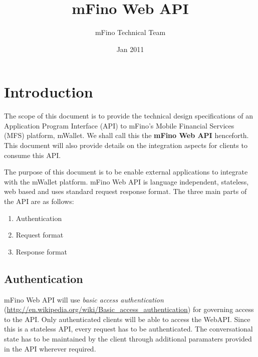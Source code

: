 \documentclass[11pt,titlepage]{article}
\title{\Huge{mFino Web API}}
\author{\Large{mFino Technical Team}}
\date {\Large{Jan 2011}}
\begin{document}
\maketitle
\tableofcontents
\listoftables

\newpage
\section{Introduction}
The scope of this document is to provide the technical design specifications of an Application Program Interface (API) to mFino's Mobile Financial Services (MFS) platform, mWallet. We shall call this the \textbf{mFino Web API} henceforth. This document will also provide details on the integration aspects for clients to consume this API.

The purpose of this document is to be enable external applications to integrate with the mWallet platform. mFino Web API is language independent, stateless, web based and uses standard request response format. The three main parts of the API are as follows:
\begin{enumerate}
\item Authentication
\item Request format
\item Response format
\end{enumerate}

\subsection{Authentication}
mFino Web API will use {\em basic access authentication}  ({\url{http://en.wikipedia.org/wiki/Basic_access_authentication}}) for governing  access to the API. Only authenticated clients will be able to access the WebAPI. Since this is a stateless API, every request has to be authenticated. The conversational state has to be maintained by the client through additional paramaters provided in the API wherever required. 
\end{document}
